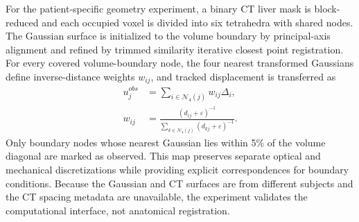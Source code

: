 \documentclass[pdflatex,lineno,referee,sn-vancouver,Numbered]{sn-jnl}
\begin{document}
For the patient-specific geometry experiment, a binary CT liver mask is
block-reduced and each occupied voxel is divided into six tetrahedra with
shared nodes. The Gaussian surface is initialized to the volume boundary
by principal-axis alignment and refined by trimmed similarity iterative
closest point registration. For every covered volume-boundary node, the
four nearest transformed Gaussians define inverse-distance weights
$w_{ij}$, and tracked displacement is transferred as
\begin{equation}
\begin{aligned}
u_j^{obs} &= \sum_{i\in\mathcal{N}_4(j)} w_{ij}\Delta_i,\\
w_{ij} &=
\frac{(d_{ij}+\varepsilon)^{-1}}
{\sum_{k\in\mathcal{N}_4(j)}(d_{kj}+\varepsilon)^{-1}} .
\end{aligned}
\label{eq:surface_volume_map}
\end{equation}
Only boundary nodes whose nearest Gaussian lies within 5\% of the volume
diagonal are marked as observed. This map preserves separate optical and
mechanical discretizations while providing explicit correspondences for
boundary conditions. Because the Gaussian and CT surfaces are from
different subjects and the CT spacing metadata are unavailable, the
experiment validates the computational interface, not anatomical
registration.
\end{document}
